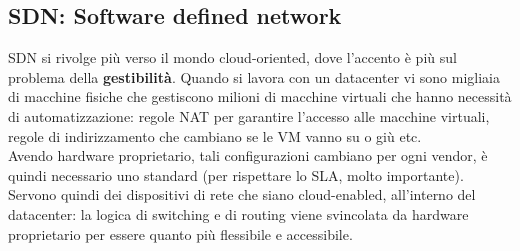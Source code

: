 \documentclass{article}
\begin{document}
		\subsection{SDN: Software defined network}
		SDN si rivolge più verso il mondo cloud-oriented, dove l’accento è più sul problema della \textbf{gestibilità}. Quando si lavora con un datacenter vi sono migliaia di macchine fisiche che 	gestiscono milioni di macchine virtuali che hanno necessità di automatizzazione: regole	NAT per garantire l’accesso alle macchine virtuali, regole di indirizzamento che
		cambiano se le VM vanno su o giù etc.\\
		Avendo hardware proprietario, tali configurazioni cambiano per ogni vendor, è quindi necessario uno standard (per rispettare lo SLA, molto importante).
		Servono quindi dei dispositivi di rete che siano cloud-enabled, all’interno del	datacenter: la logica di switching e di routing viene svincolata da hardware proprietario per essere quanto più flessibile e accessibile.
		
\end{document}
